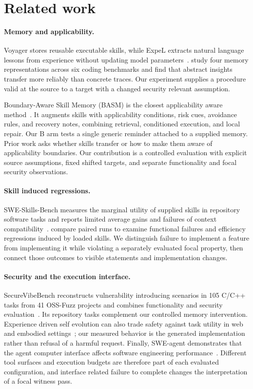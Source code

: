 \section{Related work}
\paragraph{Memory and applicability.}
Voyager stores reusable executable skills, while ExpeL extracts natural language lessons from experience without updating model parameters~\citep{voyager,expel}. \citet{mtl} study four memory representations across six coding benchmarks and find that abstract insights transfer more reliably than concrete traces. Our experiment supplies a procedure valid at the source to a target with a changed security relevant assumption.

Boundary-Aware Skill Memory (BASM) is the closest applicability aware method~\citep{basm}. It augments skills with applicability conditions, risk cues, avoidance rules, and recovery notes, combining retrieval, conditioned execution, and local repair. Our B arm tests a single generic reminder attached to a supplied memory. Prior work asks whether skills transfer or how to make them aware of applicability boundaries. Our contribution is a controlled evaluation with explicit source assumptions, fixed shifted targets, and separate functionality and focal security observations.

\paragraph{Skill induced regressions.}
SWE-Skills-Bench measures the marginal utility of supplied skills in repository software tasks and reports limited average gains and failures of context compatibility~\citep{sweskills}. \citet{harmfulskills} compare paired runs to examine functional failures and efficiency regressions induced by loaded skills. We distinguish failure to implement a feature from implementing it while violating a separately evaluated focal property, then connect those outcomes to visible statements and implementation changes.

\paragraph{Security and the execution interface.}
SecureVibeBench reconstructs vulnerability introducing scenarios in 105 C/C++ tasks from 41 OSS-Fuzz projects and combines functionality and security evaluation~\citep{securevibebench}. Its repository tasks complement our controlled memory intervention. Experience driven self evolution can also trade safety against task utility in web and embodied settings~\citep{experience_safety}; our measured behavior is the generated implementation rather than refusal of a harmful request. Finally, SWE-agent demonstrates that the agent computer interface affects software engineering performance~\citep{sweagent}. Different tool surfaces and execution budgets are therefore part of each evaluated configuration, and interface related failure to complete changes the interpretation of a focal witness pass.
